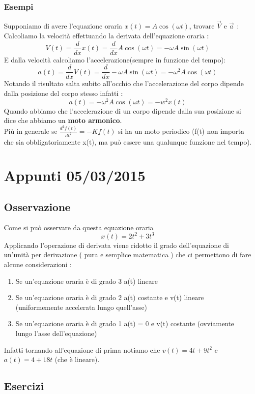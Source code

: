 \documentclass[fontsize = 20px, paper = a4]{article}
\begin{document}
\subsubsection{Esempi}
Supponiamo di avere l'equazione oraria $x(t) = A\cos(\omega t)$, trovare $\overrightarrow{V}$ e $\overrightarrow{a}$ : \\ 
Calcoliamo la velocità effettuando la derivata dell'equazione oraria :
$$V(t) = \frac{d}{dx}x(t)= \frac{d}{dx} A\cos(\omega t) = -\omega A \sin(\omega t)$$
E dalla velocità calcoliamo l'accelerazione(sempre in funzione del tempo):
$$a(t) = \frac{d}{dx}V(t) = \frac{d}{dx} -\omega A \sin(\omega t) = -\omega^2 A \cos (\omega t)$$
Notando il risultato salta subito all'occhio che l'accelerazione del corpo dipende dalla posizione del corpo stesso infatti :
$$a(t) = -\omega^2 A\cos (\omega t) =  -w^2x(t)$$
Quando abbiamo che l'accelerazione di un corpo dipende dalla sua posizione si dice che abbiamo un \textbf{moto armonico}. \\
Più in generale se $\frac{d^2 f(t)}{dt^2} = -Kf(t) $ si ha un moto periodico (f(t) non importa che sia obbligatoriamente x(t), ma può essere una qualunque funzione nel tempo). \newpage
\section{Appunti 05/03/2015}
\subsection{Osservazione}
Come si può osservare da questa equazione oraria
$$x(t) = 2t^2 + 3t^3$$
Applicando l'operazione di derivata viene ridotto il grado dell'equazione di un'unità per derivazione ( pura e semplice matematica ) che ci permettono di fare alcune considerazioni :
\begin{enumerate}
\item Se un'equazione oraria è di grado 3 a(t) lineare
\item Se un'equazione oraria è di grado 2 a(t) costante e v(t) lineare (uniformemente accelerata lungo quell'asse)
\item Se un'equazione oraria è di grado 1 a(t) = 0 e v(t) costante (ovviamente lungo l'asse dell'equazione)
\end{enumerate}
Infatti tornando all'equazione di prima notiamo che $v(t) = 4t + 9t^2$ e $a(t) = 4 + 18t$ (che è  lineare).
\subsection{Esercizi}
\end{document}
